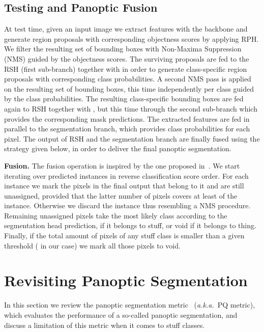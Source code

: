 \documentclass[10pt,twocolumn,letterpaper]{article}
\newcommand{\aka}{\emph{a.k.a.}\xspace }
\renewcommand{\paragraph}[1]{
        \vspace{3pt}
	\noindent\textbf{#1}}
\begin{document}
\subsection{Testing and Panoptic Fusion}\label{ssec:fusion}
 At test time, given an input image  we extract features  with the backbone and generate region proposals with corresponding objectness scores by applying RPH. We filter the resulting set of bounding boxes with Non-Maxima Suppression (NMS)
guided by the objectness scores. The surviving proposals are fed to the RSH (first sub-branch) together with  in order to generate class-specific region proposals with corresponding class probabilities. A second NMS pass is applied on the resulting set of bounding boxes, this time independently per class guided by the class probabilities. The resulting class-specific bounding boxes are fed again to RSH together with , but this time through the second sub-branch which provides the corresponding mask predictions. 
The extracted features  are fed in parallel to the segmentation branch, which provides class probabilities for each pixel. 
The output of RSH and the segmentation branch are finally fused using the strategy given below, in order to deliver the final panoptic segmentation. 



\paragraph{Fusion.} 
The fusion operation is inspired by the one proposed in~\cite{Kirillov18}.
We start iterating over predicted instances in reverse classification score order. For each instance we mark the pixels in the final output that belong to it and are still unassigned, provided that the latter number of pixels covers at least  of the instance. Otherwise we discard the instance thus resembling a NMS procedure.
Remaining unassigned pixels take the most likely class according to the segmentation head prediction, if it belongs to stuff, or void if it belongs to thing. Finally, if the total amount of pixels of any stuff class is smaller than a given threshold ( in our case) we mark all those pixels to void.







\section{Revisiting Panoptic Segmentation}
In this section we review the panoptic segmentation metric~\cite{Kirillov18} (\aka~PQ metric), which evaluates the performance of a so-called panoptic segmentation, and discuss a limitation of this metric when it comes to stuff classes.
\end{document}
